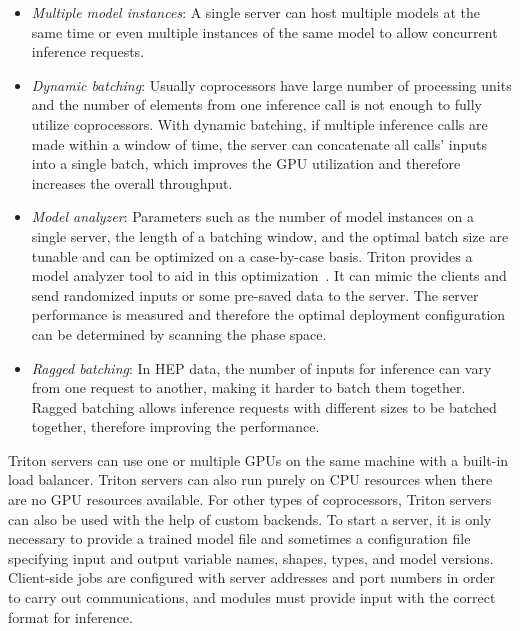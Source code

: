\begin{itemize}
 \item \emph{Multiple model instances}: A single server can host multiple models at the same time or even multiple instances of the same model to allow concurrent inference requests.
 \item \emph{Dynamic batching}: Usually coprocessors have large number of processing units and the number of elements from one inference call is not enough to fully utilize coprocessors. With dynamic batching, if multiple inference calls are made within a window of time, the server can concatenate all calls' inputs into a single batch, which improves the GPU utilization and therefore increases the overall throughput.
 \item \emph{Model analyzer}: Parameters such as the number of model instances on a single server, the length of a batching window, and the optimal batch size are tunable and can be optimized on a case-by-case basis. Triton provides a model analyzer tool to aid in this optimization~\cite{triton_model_analyzer}. It can mimic the clients and send randomized inputs or some pre-saved data to the server. The server performance is measured and therefore the optimal deployment configuration can be determined by scanning the phase space.
 \item \emph{Ragged batching}: In HEP data, the number of inputs for inference can vary from one request to another, making it harder to batch them together. Ragged batching allows inference requests with different sizes to be batched together, therefore improving the performance. 
\end{itemize}

Triton servers can use one or multiple GPUs on the same machine with a built-in load balancer. Triton servers can also run purely on CPU resources when there are no GPU resources available. For other types of coprocessors, Triton servers can also be used with the help of custom backends. To start a server, it is only necessary to provide a trained model file and sometimes a configuration file specifying input and output variable names, shapes, types, and model versions. Client-side jobs are configured with server addresses and port numbers in order to carry out communications, and modules must provide input with the correct format for inference.


